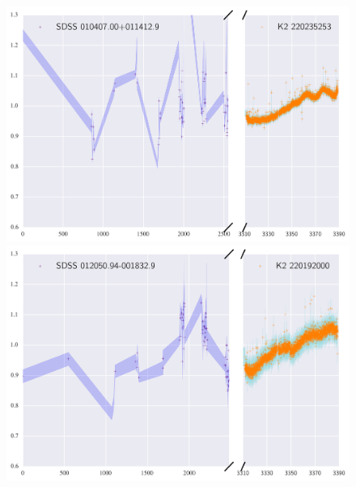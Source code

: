 \documentclass[a4paper,fleqn,usenatbib]{mnras}
\begin{document}
        	\begin{figure}
        		\includegraphics[width=\columnwidth]{220235253ExtendedLC.png}
        		\includegraphics[width=\columnwidth]{220192000ExtendedLC.png}
        		\caption{}
        		\label{fig:example_figure}
        	\end{figure}   
        	
\end{document}
